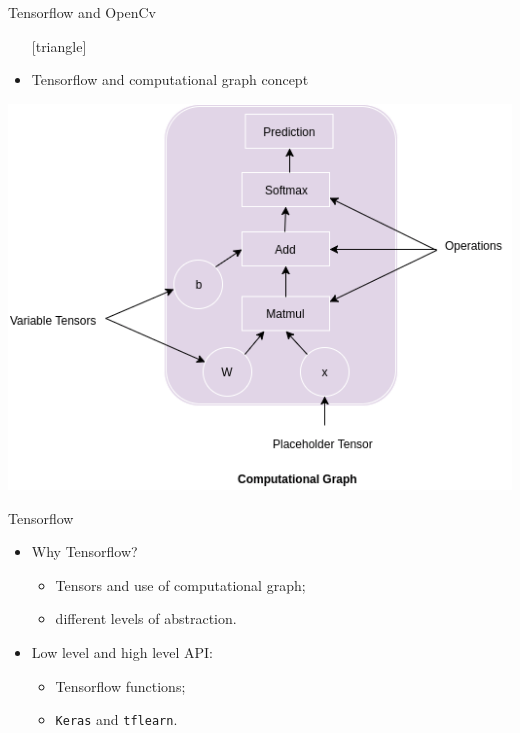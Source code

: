 \documentclass{beamer}
\begin{document}
\begin{frame}{Tensorflow and OpenCv}
	\begin{itemize}
		\setlength\itemsep{1em}
		[triangle]
		\item 
			Tensorflow and computational graph concept
	\end{itemize}
	\begin{center}
    		\includegraphics[scale=0.4]{comp}
	\end{center}
\end{frame}

\begin{frame}{Tensorflow}
	\begin{itemize}
		\setlength\itemsep{1em}
		[triangle]
		\item
			Why Tensorflow?
			\begin{itemize}
				[circle]
				\item 
					Tensors and use of computational graph;
				\item 
					different levels of abstraction.
			\end{itemize}
		\item 
			Low level and high level API:
			\begin{itemize}
				[circle]
				\item 
					Tensorflow functions;
				\item 
					\texttt{Keras} and \texttt{tflearn}.
			\end{itemize}
	\end{itemize}
\end{frame}
\end{document}
